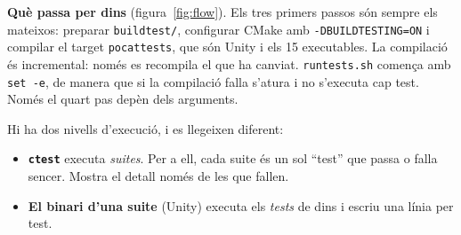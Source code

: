 \documentclass[11pt,a4paper]{article}
\DeclareRobustCommand{\_}{\textunderscore\allowbreak}
\newcommand{\cd}[1]{\texttt{#1}}
\begin{document}
\textbf{Què passa per dins} (figura~\ref{fig:flow}). Els tres primers passos són sempre
els mateixos: preparar \cd{build\_test/}, configurar CMake amb \cd{-DBUILD\_TESTING=ON} i
compilar el target \cd{pocat\_tests}, que són Unity i els 15 executables. La compilació és
incremental: només es recompila el que ha canviat. \cd{run\_tests.sh} comença amb
\cd{set -e}, de manera que si la compilació falla s'atura i no s'executa cap test. Només
el quart pas depèn dels arguments.

Hi ha dos nivells d'execució, i es llegeixen diferent:
\begin{itemize}
\item \textbf{\cd{ctest}} executa \emph{suites}. Per a ell, cada suite és un sol ``test'' que
  passa o falla sencer. Mostra el detall només de les que fallen.
\item \textbf{El binari d'una suite} (Unity) executa els \emph{tests} de dins i escriu una
  línia per test.
\end{itemize}
\end{document}
